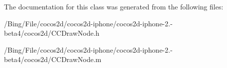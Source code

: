 The documentation for this class was generated from the following files\-:\begin{DoxyCompactItemize}
\item 
/\-Bing/\-File/cocos2d/cocos2d-\/iphone/cocos2d-\/iphone-\/2.-\/beta4/cocos2d/C\-C\-Draw\-Node.\-h\item 
/\-Bing/\-File/cocos2d/cocos2d-\/iphone/cocos2d-\/iphone-\/2.-\/beta4/cocos2d/C\-C\-Draw\-Node.\-m\end{DoxyCompactItemize}
